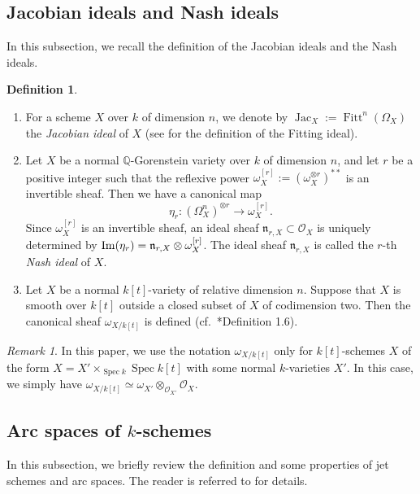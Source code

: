 \documentclass[a4paper,11pt]{amsart}
\theoremstyle{definition}
\newtheorem{defi}[thm]{Definition}
\theoremstyle{remark}
\newtheorem{rmk}[thm]{Remark}
\begin{document}
\subsection{Jacobian ideals and Nash ideals}
In this subsection, we recall the definition of the Jacobian ideals and the Nash ideals. 
\begin{defi}\label{defi:nash}
\begin{enumerate}
\item  
For a scheme $X$ over $k$ of dimension $n$, we denote by 
$\operatorname{Jac}_X := \operatorname{Fitt} ^n (\Omega _X)$ the \textit{Jacobian ideal} of $X$ (see \cite{Eis95} for the definition of the Fitting ideal). 

\item 
Let $X$ be a normal $\mathbb{Q}$-Gorenstein variety over $k$ of dimension $n$, and 
let $r$ be a positive integer such that the reflexive power $\omega _X ^{[r]} := \left( \omega _X ^{\otimes r} \right)^{**}$ is an invertible sheaf. 
Then we have a canonical map
\[
\eta_r \colon \left( \Omega_X^n \right )^{\otimes r} \to \omega _X ^{[r]}.
\] 
Since $\omega _X ^{[r]}$ is an invertible sheaf, 
an ideal sheaf $\mathfrak{n}_{r,X} \subset \mathcal{O}_X$ is uniquely determined by 
${\rm Im}(\eta_r) = \mathfrak{n}_{r,X} \otimes \omega _X ^{[r]}$.
The ideal sheaf $\mathfrak n_{r,X}$ is called the $r$-th \textit{Nash ideal} of $X$.

\item 
Let $X$ be a normal $k[t]$-variety of relative dimension $n$. Suppose that $X$ is smooth over $k[t]$ outside a closed subset of $X$ of codimension two. 
Then the canonical sheaf $\omega _{X/k[t]}$ is defined (cf.\ \cite{Kol13}*{Definition 1.6}). 
\end{enumerate}
\end{defi}

\begin{rmk}\label{rmk:nash}
In this paper, we use the notation $\omega _{X/k[t]}$ only for $k[t]$-schemes $X$ of the form 
$X = X' \times _{\operatorname{Spec} k} \operatorname{Spec} k[t]$ with some normal $k$-varieties $X'$. 
In this case, we simply have $\omega _{X/k[t]} \simeq \omega _{X'} \otimes _{\mathcal{O}_{X'}} \mathcal{O}_X$. 
\end{rmk}

\subsection{Arc spaces of $k$-schemes}\label{subsection:arc}
In this subsection, we briefly review the definition and some properties of jet schemes and arc spaces. The reader is referred to \cite{EM09} for details.
\end{document}
